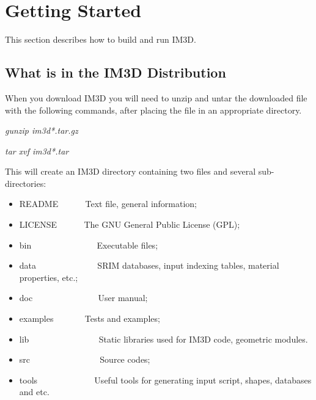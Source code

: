 
\chapter{Getting Started}  %

\label{Chapter2}  %



This section describes how to build and run IM3D.


\section{What is in the IM3D Distribution}

When you download IM3D you will need to unzip and untar the downloaded file with the following commands, after placing the file in an appropriate directory.

\quad \textsl{gunzip im3d*.tar.gz}

\quad \textsl{tar xvf im3d*.tar}

This will create an IM3D directory containing two files and several sub-directories:

\begin{itemize}

\item README ~~~~~ Text file, general information;

\item LICENSE ~~~~~ The GNU General Public License (GPL);

\item bin ~~~~~~~~~~~~~~ Executable files;

\item data ~~~~~~~~~~~~~ SRIM databases, input indexing tables, material properties, etc.;

\item doc ~~~~~~~~~~~~~~ User manual;

\item examples ~~~~~~ Tests and examples;

\item lib ~~~~~~~~~~~~~~~ Static libraries used for IM3D code, geometric modules.

\item src ~~~~~~~~~~~~~~~ Source codes;

\item tools ~~~~~~~~~~~~ Useful tools for generating input script, shapes, databases and etc.

\end{itemize}

